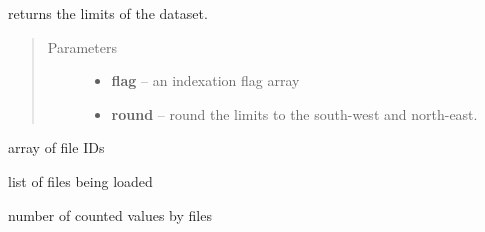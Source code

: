 \documentclass[letterpaper,10pt,english]{sphinxmanual}
\begin{document}
\begin{fulllineitems}
\begin{fulllineitems}
\end{fulllineitems}


\begin{fulllineitems}
\label{altimetry.data:altimetry.data.hydro_data.extension}
returns the limits of the dataset.
\begin{quote}\begin{description}
\item[{Parameters}] \leavevmode\begin{itemize}
\item {} 
\textbf{flag} -- an indexation flag array

\item {} 
\textbf{round} -- round the limits to the south-west and north-east.

\end{itemize}

\end{description}\end{quote}

\end{fulllineitems}


\begin{fulllineitems}
\label{altimetry.data:altimetry.data.hydro_data.fileid}
array of file IDs

\end{fulllineitems}


\begin{fulllineitems}
\label{altimetry.data:altimetry.data.hydro_data.filelist}
list of files being loaded

\end{fulllineitems}


\begin{fulllineitems}
\label{altimetry.data:altimetry.data.hydro_data.filelist_count}
number of counted values by files

\end{fulllineitems}


\end{fulllineitems}
\end{document}
